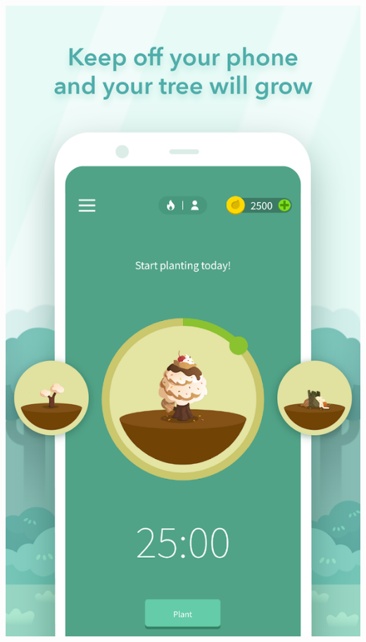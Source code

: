 \documentclass[11pt]{article}
\begin{document}
\begin{itemize}
\begin{center}
\includegraphics[width=.9\linewidth]{./docs/2.png}
\end{center}
\begin{center}

\end{center}
\end{itemize}
\end{document}
